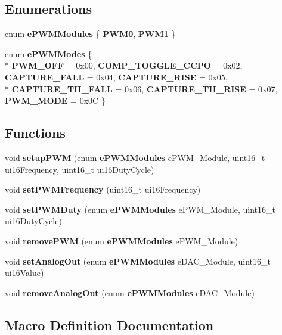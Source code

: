 \subsection*{Enumerations}
\begin{DoxyCompactItemize}
\item 
enum {\bf e\-P\-W\-M\-Modules} \{ {\bf P\-W\-M0}, 
{\bf P\-W\-M1}
 \}
\item 
enum {\bf e\-P\-W\-M\-Modes} \{ \\*
{\bf P\-W\-M\-\_\-\-O\-F\-F} =  0x00, 
{\bf C\-O\-M\-P\-\_\-\-T\-O\-G\-G\-L\-E\-\_\-\-C\-C\-P\-O} =  0x02, 
{\bf C\-A\-P\-T\-U\-R\-E\-\_\-\-F\-A\-L\-L} =  0x04, 
{\bf C\-A\-P\-T\-U\-R\-E\-\_\-\-R\-I\-S\-E} =  0x05, 
\\*
{\bf C\-A\-P\-T\-U\-R\-E\-\_\-T\-H\-\_\-\-F\-A\-L\-L} =  0x06, 
{\bf C\-A\-P\-T\-U\-R\-E\-\_\-T\-H\-\_\-\-R\-I\-S\-E} =  0x07, 
{\bf P\-W\-M\-\_\-\-M\-O\-D\-E} =  0x0\-C
 \}
\end{DoxyCompactItemize}
\subsection*{Functions}
\begin{DoxyCompactItemize}
\item 
void {\bf setup\-P\-W\-M} (enum {\bf e\-P\-W\-M\-Modules} e\-P\-W\-M\-\_\-\-Module, uint16\-\_\-t ui16\-Frequency, uint16\-\_\-t ui16\-Duty\-Cycle)
\item 
void {\bf set\-P\-W\-M\-Frequency} (uint16\-\_\-t ui16\-Frequency)
\item 
void {\bf set\-P\-W\-M\-Duty} (enum {\bf e\-P\-W\-M\-Modules} e\-P\-W\-M\-\_\-\-Module, uint16\-\_\-t ui16\-Duty\-Cycle)
\item 
void {\bf remove\-P\-W\-M} (enum {\bf e\-P\-W\-M\-Modules} e\-P\-W\-M\-\_\-\-Module)
\item 
void {\bf set\-Analog\-Out} (enum {\bf e\-P\-W\-M\-Modules} e\-D\-A\-C\-\_\-\-Module, uint16\-\_\-t ui16\-Value)
\item 
void {\bf remove\-Analog\-Out} (enum {\bf e\-P\-W\-M\-Modules} e\-D\-A\-C\-\_\-\-Module)
\end{DoxyCompactItemize}


\subsection{Macro Definition Documentation}
